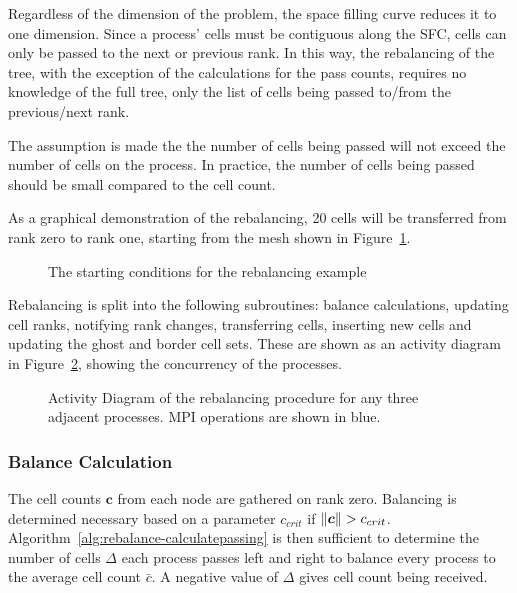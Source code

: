 \documentclass[twoside]{IIBproject}
\newcommand{\vect} [1] {\bm{#1}}
\numberwithin{figure}{section}
\begin{document}
        Regardless of the dimension of the problem, the space filling curve reduces it to one dimension. Since a process' cells must be contiguous along the SFC, cells can only be passed to the next or previous rank. In this way, the rebalancing of the tree, with the exception of the calculations for the pass counts, requires no knowledge of the full tree, only the list of cells being passed to/from the previous/next rank.

        The assumption is made the the number of cells being passed will not exceed the number of cells on the process. In practice, the number of cells being passed should be small compared to the cell count. 

        As a graphical demonstration of the rebalancing, 20 cells will be transferred from rank zero to rank one, starting from the mesh shown in Figure~\ref{fig:rebalance-init}.

        \begin{figure}[!htbp]
            
            \caption{The starting conditions for the rebalancing example}
            \label{fig:rebalance-init}
        \end{figure}

        Rebalancing is split into the following subroutines: balance calculations, updating cell ranks, notifying rank changes, transferring cells, inserting new cells and updating the ghost and border cell sets. These are shown as an activity diagram in Figure~\ref{fig:rebalance-overview}, showing the concurrency of the processes.

        \begin{figure}[!htbp]
            
            \caption{Activity Diagram of the rebalancing procedure for any three adjacent processes. MPI operations are shown in blue.}
            \label{fig:rebalance-overview}
        \end{figure}


        \subsubsection{Balance Calculation} %
            \label{sec:rebalancing-calc}

            The cell counts $\vect{c}$ from each node are gathered on rank zero. Balancing is determined necessary based on a parameter $c_{crit}$ if $\norm{\vect{c}}>c_{crit}$. Algorithm~\ref{alg:rebalance-calculatepassing} is then sufficient to determine the number of cells $\Delta$ each process passes left and right to balance every process to the average cell count $\bar c$. A negative value of $\Delta$ gives cell count being received. 
\end{document}

